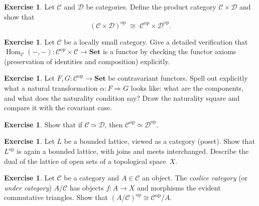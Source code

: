 \documentclass[a4paper,12pt]{book}
\DeclareMathOperator{\Hom}{Hom}
\newcommand{\Set}{\mathbf{Set}}
\newcommand{\op}{\mathrm{op}}
\theoremstyle{definition}
\newtheorem{exercise}[definition]{Exercise}
\theoremstyle{plain}
\theoremstyle{remark}
\begin{document}
\begin{exercise}\label{exo:product-category}
Let $\mathcal{C}$ and $\mathcal{D}$ be categories.
Define the product category $\mathcal{C}\times\mathcal{D}$ and show that
\[
    (\mathcal{C}\times\mathcal{D})^{\op}
    \;\cong\;
    \mathcal{C}^{\op}\times\mathcal{D}^{\op}.
\]
\end{exercise}

\begin{exercise}\label{exo:hom-bifunctor-verification}
Let $\mathcal{C}$ be a locally small category.
Give a detailed verification that
$\Hom_\mathcal{C}(-,-)\colon\mathcal{C}^{\op}\times\mathcal{C}\to\Set$
is a functor by checking the functor axioms (preservation of identities
and composition) explicitly.
\end{exercise}

\begin{exercise}\label{exo:contravariant-nat-trans}
Let $F,G\colon\mathcal{C}^{\op}\to\Set$ be contravariant functors.
Spell out explicitly what a natural transformation
$\alpha\colon F\Rightarrow G$ looks like: what are the components, and
what does the naturality condition say?
Draw the naturality square and compare it with the covariant case.
\end{exercise}

\begin{exercise}\label{exo:op-preserves-equivalence}
Show that if $\mathcal{C}\simeq\mathcal{D}$, then
$\mathcal{C}^{\op}\simeq\mathcal{D}^{\op}$.
\end{exercise}

\begin{exercise}\label{exo:concrete-duality-exploration}
Let $L$ be a bounded lattice, viewed as a category (poset).
Show that $L^{\op}$ is again a bounded lattice, with joins and meets
interchanged.  Describe the dual of the lattice of open sets of a
topological space~$X$.
\end{exercise}

\begin{exercise}\label{exo:op-slice}
Let $\mathcal{C}$ be a category and $A\in\mathcal{C}$ an object.
The \emph{coslice category} (or \emph{under category}) $A/\mathcal{C}$
has objects $f\colon A\to X$ and morphisms the evident commutative
triangles.
Show that $(A/\mathcal{C})^{\op}\cong\mathcal{C}^{\op}/A$.
\end{exercise}
\end{document}
